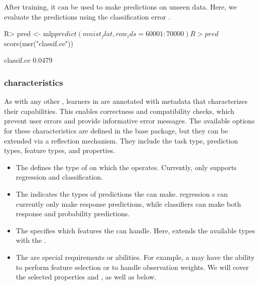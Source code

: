 \documentclass[article]{jss}
\theoremstyle{definition}
\begin{document}
After training, it can be used to make predictions on unseen data.
Here, we evaluate the predictions using the classification error .

\begin{CodeInput}
R> pred <- mlp$predict(mnist_flat, row_ids = 60001:70000)
R> pred$score(msr("classif.ce"))
\end{CodeInput}

\begin{CodeOutput}
classif.ce
    0.0479
\end{CodeOutput}

\subsubsection[Learner characteristics]{ characteristics}\label{sec:learner-characteristics}

As with any other , learners in  are annotated with metadata that characterizes their capabilities.
This enables correctness and compatibility checks, which prevent user errors and provide informative error messages.
The available options for these characteristics are defined in the  base package, but they can be extended via a reflection mechanism.
They include the task type, prediction types, feature types, and properties.


\begin{itemize}
    \item The  defines the type of  on which the  operates. Currently,  only supports regression and classification.
    \item The  indicates the types of predictions the  can make. \torch{} regression s can currently only make response predictions, while classifiers can make both response and probability predictions.
    \item The  specifies which features the  can handle. Here, \mlrttorch{} extends the available types with the .
    \item The  are special requirements or abilities. For example, a  may have the ability to perform feature selection or to handle observation weights. We will cover the selected properties  and , as well as  below.
\end{itemize}
\end{document}
